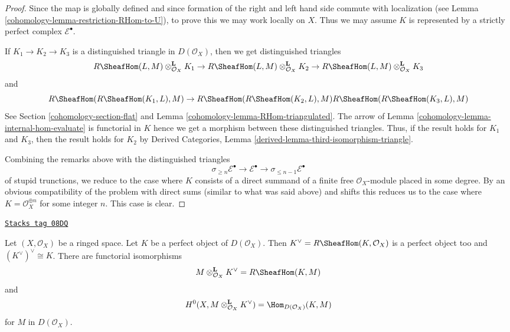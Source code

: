 \begin{proof}

Since the map is globally defined and since formation of the right and
left hand side commute with localization
(see Lemma \ref{cohomology-lemma-restriction-RHom-to-U}), to prove this we may work
locally on $X$. Thus we may assume $K$ is represented by a strictly
perfect complex $\mathcal{E}^\bullet$.

\medskip\noindent
If $K_1 \to K_2 \to K_3$ is a distinguished triangle in $D(\mathcal{O}_X)$,
then we get distinguished triangles
$$
R\SheafHom(L, M) \otimes_{\mathcal{O}_X}^\mathbf{L} K_1 \to
R\SheafHom(L, M) \otimes_{\mathcal{O}_X}^\mathbf{L} K_2 \to
R\SheafHom(L, M) \otimes_{\mathcal{O}_X}^\mathbf{L} K_3
$$
and
$$
R\SheafHom(R\SheafHom(K_1, L), M) \to
R\SheafHom(R\SheafHom(K_2, L), M)
R\SheafHom(R\SheafHom(K_3, L), M)
$$
See Section \ref{cohomology-section-flat} and
Lemma \ref{cohomology-lemma-RHom-triangulated}.
The arrow of Lemma \ref{cohomology-lemma-internal-hom-evaluate} is functorial in $K$
hence we get a morphism between these distinguished triangles.
Thus, if the result holds for $K_1$ and $K_3$, then the result holds for
$K_2$ by Derived Categories, Lemma
\ref{derived-lemma-third-isomorphism-triangle}.

\medskip\noindent
Combining the remarks above with the distinguished triangles
$$
\sigma_{\geq n}\mathcal{E}^\bullet \to \mathcal{E}^\bullet \to
\sigma_{\leq n - 1}\mathcal{E}^\bullet
$$
of stupid trunctions, we reduce to the case where $K$ consists
of a direct summand of a finite free $\mathcal{O}_X$-module placed
in some degree. By an obvious compatibility of the problem with direct sums
(similar to what was said above) and shifts this reduces us to the case
where $K = \mathcal{O}_X^{\oplus n}$ for some integer $n$.
This case is clear.
\end{proof}

\begin{lemma}
\label{cohomology-lemma-dual-perfect-complex}
\href{https://stacks.math.columbia.edu/tag/08DQ}{\texttt{Stacks tag 08DQ}}

Let $(X, \mathcal{O}_X)$ be a ringed space. Let $K$ be a perfect object of
$D(\mathcal{O}_X)$. Then $K^\vee = R\SheafHom(K, \mathcal{O}_X)$ is a
perfect object too and $(K^\vee)^\vee \cong K$. There are
functorial isomorphisms
$$
M \otimes^\mathbf{L}_{\mathcal{O}_X} K^\vee = R\SheafHom(K, M)
$$
and
$$
H^0(X, M \otimes^\mathbf{L}_{\mathcal{O}_X} K^\vee) =
\Hom_{D(\mathcal{O}_X)}(K, M)
$$
for $M$ in $D(\mathcal{O}_X)$.
\end{lemma}

